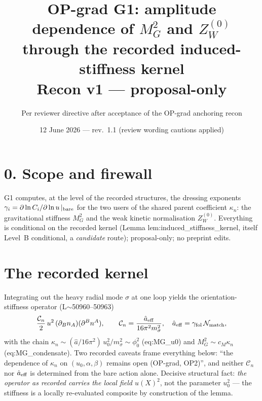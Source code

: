 \documentclass[11pt,a4paper]{article}
\title{\textbf{OP-grad G1: amplitude dependence of $M_G^2$ and $Z_W^{(0)}$
through the recorded induced-stiffness kernel}\\\large Recon v1 ---
proposal-only}
\author{Per reviewer directive after acceptance of the OP-grad anchoring recon}
\date{12 June 2026 --- rev.~1.1 (review wording cautions applied)}
\begin{document}
\maketitle

\section*{0. Scope and firewall}
G1 computes, at the level of the recorded structures, the dressing exponents
$\gamma_i=\partial\ln C_i/\partial\ln u\,|_{\rm bare}$ for the two users of the
shared parent coefficient $\kappa_n$: the gravitational stiffness $M_G^2$ and
the weak kinetic normalisation $Z_W^{(0)}$. Everything is conditional on the
recorded kernel (Lemma lem:induced\_stiffness\_kernel, itself Level~B
conditional, a \emph{candidate} route); proposal-only; no preprint edits.

\section{The recorded kernel}
Integrating out the heavy radial mode $\sigma$ at one loop yields the
orientation-stiffness operator (L$\sim$50960--50963)
\[
\frac{\mathcal C_n}{2}\,u^2\,(\partial_B n_A)(\partial^B n^A),
\qquad
\mathcal C_n=\frac{\hat a_{\rm eff}}{16\pi^2 m_\sigma^2},\quad
\hat a_{\rm eff}=\gamma_{\rm fol}\,\mathcal N_{\rm match},
\]
with the chain $\kappa_n\sim(\hat a/16\pi^2)\,u_0^2/m_\sigma^2\sim\phi_0^2$
(eq:MG\_u0) and $M_G^2\sim c_M\kappa_n$ (eq:MG\_condensate). Two recorded
caveats frame everything below: ``the dependence of $\kappa_n$ on
$(u_0,\alpha,\beta)$ remains open (OP-grad, OP2)'', and neither $\mathcal C_n$
nor $\hat a_{\rm eff}$ is determined from the bare action alone. Decisive
structural fact: \emph{the operator as recorded carries the local field
$u(X)^2$}, not the parameter $u_0^2$ --- the stiffness is a locally
re-evaluated composite by construction of the lemma.
\end{document}
